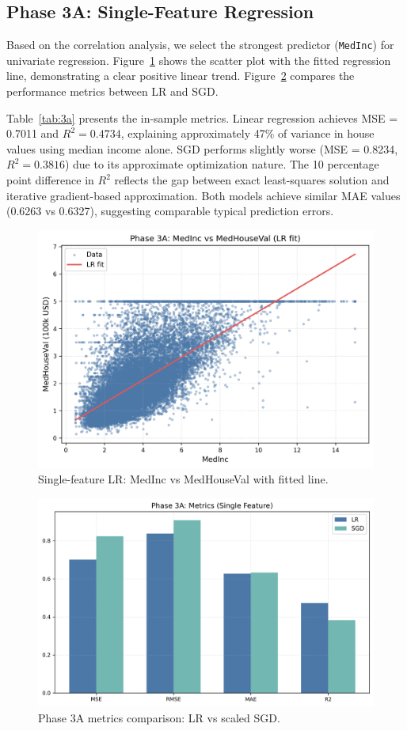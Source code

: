 \documentclass[runningheads]{llncs}
\begin{document}
\subsection{Phase 3A: Single-Feature Regression}
Based on the correlation analysis, we select the strongest predictor (\texttt{MedInc}) for univariate regression. Figure~\ref{fig:3a-scatter} shows the scatter plot with the fitted regression line, demonstrating a clear positive linear trend. Figure~\ref{fig:3a-metrics} compares the performance metrics between LR and SGD.

Table~\ref{tab:3a} presents the in-sample metrics. Linear regression achieves MSE = 0.7011 and $R^2 = 0.4734$, explaining approximately 47\% of variance in house values using median income alone. SGD performs slightly worse (MSE = 0.8234, $R^2 = 0.3816$) due to its approximate optimization nature. The 10 percentage point difference in $R^2$ reflects the gap between exact least-squares solution and iterative gradient-based approximation. Both models achieve similar MAE values (0.6263 vs 0.6327), suggesting comparable typical prediction errors.

\begin{figure}[H]
  \centering
  \includegraphics[width=0.9\linewidth]{data/Phase 3A MedInc vs MidHouseVal.png}
  \caption{Single-feature LR: MedInc vs MedHouseVal with fitted line.}
  \label{fig:3a-scatter}
\end{figure}

\begin{figure}[H]
  \centering
  \includegraphics[width=0.9\linewidth]{data/Phase 3A Metrics.png}
  \caption{Phase 3A metrics comparison: LR vs scaled SGD.}
  \label{fig:3a-metrics}
\end{figure}
\end{document}
